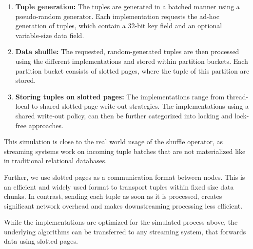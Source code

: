 \begin{enumerate}
  \item \textbf{Tuple generation:}
        The tuples are generated in a batched manner using a pseudo-random generator.
        Each implementation requests the ad-hoc generation of tuples, which contain a 32-bit key field and an optional variable-size data field.

  \item \textbf{Data shuffle:}
        The requested, random-generated tuples are then processed using the different implementations and stored within partition buckets.
        Each partition bucket consists of slotted pages, where the tuple of this partition are stored.

  \item \textbf{Storing tuples on slotted pages:}
        The implementations range from thread-local to shared slotted-page write-out strategies.
        The implementations using a shared write-out policy, can then be further categorized into locking and lock-free approaches.
\end{enumerate}
This simulation is close to the real world usage of the shuffle operator, as streaming systems work on incoming tuple batches that are not materialized like in traditional relational databases.

Further, we use slotted pages as a communication format between nodes.
This is an efficient and widely used format to transport tuples within fixed size data chunks.
In contrast, sending each tuple as soon as it is processed, creates significant network overhead and makes downstreaming processing less efficient.

While the implementations are optimized for the simulated process above, the underlying algorithms can be transferred to any streaming system, that forwards data using slotted pages.
